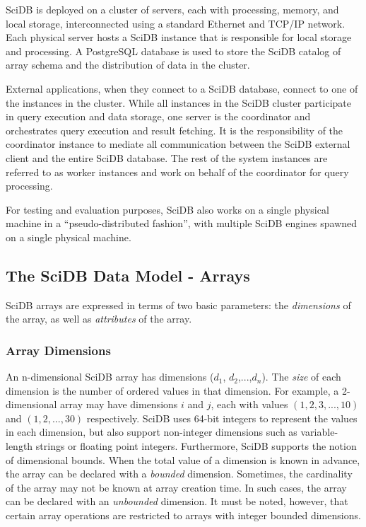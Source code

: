 \documentclass[letterpaper,twocolumn,10pt]{article}
\begin{document}
SciDB is deployed on a cluster of servers, each with processing, memory, and local storage, interconnected using a standard Ethernet and TCP/IP network. Each physical server hosts a SciDB instance that is responsible for local storage and processing.  A PostgreSQL database is used to store the SciDB catalog of array schema and the distribution of data in the cluster.

External applications, when they connect to a SciDB database, connect to one of the instances in the cluster. While all instances in the SciDB cluster participate in query execution and data storage, one server is the coordinator and orchestrates query execution and result fetching. It is the responsibility of the coordinator instance to mediate all communication between the SciDB external client and the entire SciDB database. The rest of the system instances are referred to as worker instances and work on behalf of the coordinator for query processing.

For testing and evaluation purposes, SciDB also works on a single physical machine in a ``pseudo-distributed fashion'', with multiple SciDB engines spawned on a single physical machine.

\subsection{The SciDB Data Model - Arrays}
SciDB arrays are expressed in terms of two basic parameters:  the {\em dimensions} of the array, as well as {\em attributes} of the array. 

\subsubsection{Array Dimensions}
An n-dimensional SciDB array has dimensions ($d_{1}$, $d_{2}$,$...$,$d_{n}$). The {\em size} of each dimension is the number of ordered values in that dimension. For example, a 2-dimensional array may have dimensions $i$ and $j$, each with values $(1, 2, 3, ..., 10)$ and $(1, 2, ..., 30)$ respectively. SciDB uses 64-bit integers to represent the values in each dimension, but also support non-integer dimensions such as variable-length strings or floating point integers. Furthermore, SciDB supports the notion of dimensional bounds. When the total value of a dimension is known in advance, the array can be declared with a {\em bounded} dimension. Sometimes, the cardinality of the array may not be known at array creation time. In such cases, the array can be declared with an {\em unbounded} dimension. It must be noted, however, that certain array operations are restricted to arrays with integer bounded dimensions.
\end{document}

